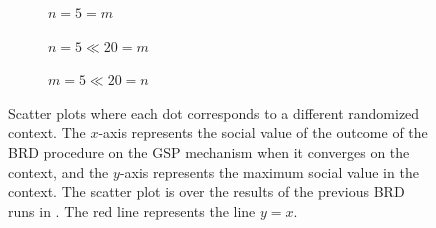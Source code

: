 \documentclass{article}
\begin{document}
\begin{enumerate}[label=(\alph*)]
    \FloatBarrier

    \begin{figure}[h]
        \centering
        \begin{subfigure}{0.49\textwidth}
            \centering
            \resizebox{\textwidth}{!}{}
            \caption{$n = 5 = m$}
        \end{subfigure}
        \hfill
        \begin{subfigure}{0.49\textwidth}
            \centering
            \resizebox{\textwidth}{!}{}
            \caption{$n = 5 \ll 20 = m$}
        \end{subfigure}

        \vspace{1em} %

        \begin{subfigure}{0.49\textwidth}
            \centering
            \resizebox{\textwidth}{!}{}
            \caption{$m = 5 \ll 20 = n$}
        \end{subfigure}

        \caption{Scatter plots where each dot corresponds to a different randomized context. The $x$-axis represents the social value of the outcome of the BRD procedure on the GSP mechanism when it converges on the context, and the $y$-axis represents the maximum social value in the context. The scatter plot is over the results of the previous BRD runs in . The red line represents the line $y = x$.}
        \label{fig:b2c_social_value}
    \end{figure}

    \FloatBarrier




\end{enumerate}
\end{document}
